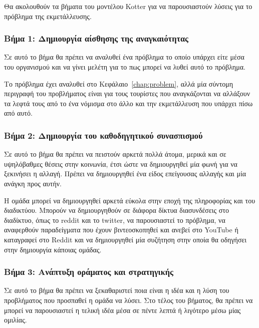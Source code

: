 Θα ακολουθούν τα βήματα του μοντέλου Kotter για να παρουσιαστούν λύσεις για το πρόβλημα της εκμετάλλευσης.

\subsubsection{Βήμα 1: Δημιουργία αίσθησης της αναγκαιότητας}

\begin{problem}
  Σε αυτό το βήμα θα πρέπει να αναλυθεί ένα πρόβλημα το οποίο υπάρχει είτε μέσα του οργανισμού και να γίνει μελέτη για το πως μπορεί να λυθεί αυτό το πρόβλημα.
\end{problem}

Το πρόβλημα έχει αναλυθεί στο Κεφάλαιο~\ref{chap:problem}, αλλά μία σύντομη περιγραφή του προβλήματος είναι για τους τουρίστες που αναγκάζονται να αλλάξουν τα λεφτά τους από το ένα νόμισμα στο άλλο και την εκμετάλλευση που υπάρχει πίσω από αυτό.

\subsubsection{Βήμα 2: Δημιουργία του καθοδηγητικού συνασπισμού}

\begin{problem}
  Σε αυτό το βήμα θα πρέπει να πειστούν αρκετά πολλά άτομα, μερικά και σε υψηλόβαθμες θέσεις στην κοινωνία, έτσι ώστε να δημιουργηθεί μία φωνή για να ξεκινήσει η αλλαγή. Πρέπει να δημιουργηθεί ένα είδος επείγουσας αλλαγής και μία ανάγκη προς αυτήν.
\end{problem}

Η ομάδα μπορεί να δημιουργηθεί αρκετά εύκολα στην εποχή της πληροφορίας και του διαδικτύου. Μπορούν να δημιουργηθούν σε διάφορα δίκτυα διασυνδέσεις στο διαδίκτυο, όπως το reddit και το twitter, να παρουσιαστεί το πρόβλημα, να αναφερθούν παραδείγματα που έχουν βιντεοσκοπηθεί και ανεβεί στο YouTube ή καταγραφεί στο Reddit και να δημιουργηθεί μία συζήτηση στην οποία θα οδηγήσει στην δημιουργία κάποιας ομάδας.

\subsubsection{Βήμα 3: Ανάπτυξη οράματος και στρατηγικής}

\begin{problem}
  Σε αυτό το βήμα θα πρέπει να ξεκαθαριστεί ποια είναι η ιδέα και η λύση του προβλήματος που προσπαθεί η ομάδα να λύσει. Στο τέλος του βήματος, θα πρέπει να μπορεί να παρουσιαστεί η τελική ιδέα μέσα σε πέντε λεπτά ή λιγότερο μέσω μίας ομιλίας.
\end{problem}

